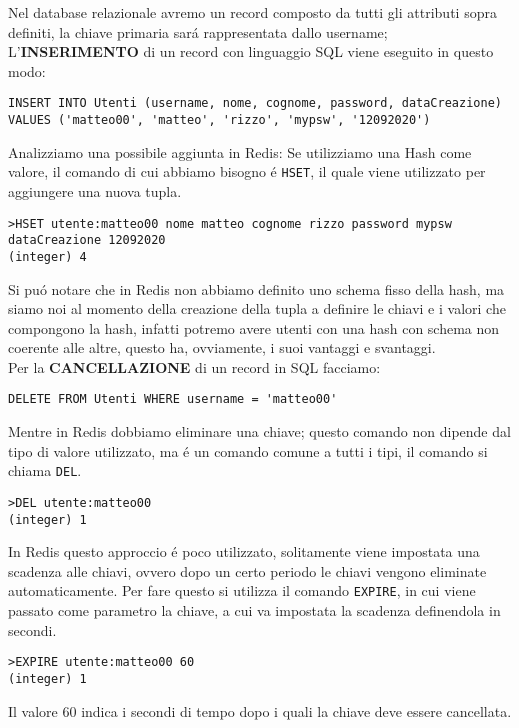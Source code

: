 Nel database relazionale avremo un record composto da tutti gli attributi sopra definiti, la chiave primaria sará rappresentata dallo username;\\

L'\textbf{INSERIMENTO} di un record con linguaggio SQL viene eseguito in questo modo:
\begin{lstlisting}[autogobble]
INSERT INTO Utenti (username, nome, cognome, password, dataCreazione)
VALUES ('matteo00', 'matteo', 'rizzo', 'mypsw', '12092020')\end{lstlisting}

Analizziamo una possibile aggiunta in Redis:
Se utilizziamo una Hash come valore, il comando di cui abbiamo bisogno é \texttt{HSET}, il quale viene utilizzato per aggiungere una nuova tupla.
\begin{lstlisting}[autogobble]
>HSET utente:matteo00 nome matteo cognome rizzo password mypsw dataCreazione 12092020
(integer) 4\end{lstlisting}

Si puó notare che in Redis non abbiamo definito uno schema fisso della hash, ma siamo noi al momento della creazione della tupla a definire le chiavi e i valori che compongono la hash,
infatti potremo avere utenti con una hash con schema non coerente alle altre, questo ha, ovviamente, i suoi vantaggi e svantaggi.\\

Per la \textbf{CANCELLAZIONE} di un record in SQL facciamo:
\begin{lstlisting}[autogobble]
DELETE FROM Utenti WHERE username = 'matteo00'\end{lstlisting}

Mentre in Redis dobbiamo eliminare una chiave; questo comando non dipende dal tipo di valore utilizzato, ma é un comando comune
a tutti i tipi, il comando si chiama \texttt{DEL}.

\begin{lstlisting}[autogobble]
>DEL utente:matteo00
(integer) 1\end{lstlisting}

In Redis questo approccio é poco utilizzato, solitamente viene impostata una scadenza alle chiavi, ovvero dopo un certo periodo le chiavi vengono eliminate automaticamente.
Per fare questo si utilizza il comando \texttt{EXPIRE}, in cui viene passato come parametro la chiave, a cui va impostata la scadenza definendola in secondi.
\begin{lstlisting}[autogobble]
>EXPIRE utente:matteo00 60
(integer) 1\end{lstlisting}
Il valore 60 indica i secondi di tempo dopo i quali la chiave deve essere cancellata.\\
 \\


